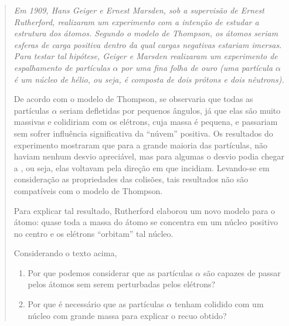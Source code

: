 \begin{quote}
{\it Em 1909, Hans Geiger e Ernest Marsden, sob a supervisão de Ernest Rutherford, realizaram um experimento com a intenção de estudar a estrutura dos átomos. Segundo o modelo de Thompson, os átomos seriam esferas de carga positiva dentro da qual cargas negativas estariam imersas. Para testar tal hipótese, Geiger e Marsden realizaram um experimento de espalhamento de partículas $\alpha$ por uma fina folha de ouro (uma partícula $\alpha$ é um núcleo de hélio, ou seja, é composta de dois prótons e dois nêutrons). 

De acordo com o modelo de Thompson, se observaria que todas as partículas $\alpha$ seriam defletidas por pequenos ângulos, já que elas são muito massivas e colidiriam com os elétrons, cuja massa é pequena, e passariam sem sofrer influência significativa da ``núvem'' positiva. Os resultados do experimento mostraram que para a grande maioria das partículas, não haviam nenhum desvio apreciável, mas para algumas o desvio podia chegar a , ou seja, elas voltavam pela direção em que incidiam. Levando-se em consideração as propriedades das colisões, tais resultados não são compatíveis com o modelo de Thompson.

Para explicar tal resultado, Rutherford elaborou um novo modelo para o átomo: quase toda a massa do átomo se concentra em um núcleo positivo no centro e os elétrons ``orbitam'' tal núcleo.}

Considerando o texto acima,
\begin{enumerate}[label=(\alph*)]
    \item Por que podemos considerar que as partículas $\alpha$ são capazes de passar pelos átomos sem serem perturbadas pelos elétrons?
    \item Por que é necessário que as partículas $\alpha$ tenham colidido com um núcleo com grande massa para explicar o recuo obtido?
\end{enumerate}
\end{quote}

